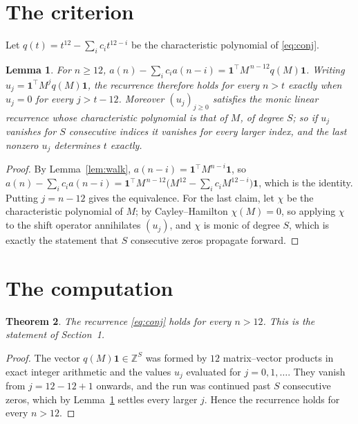 \documentclass[11pt,a4paper]{article}
\theoremstyle{plain}
\newtheorem{theorem}{Theorem}
\newtheorem{lemma}[theorem]{Lemma}
\theoremstyle{definition}
\begin{document}
\section{The criterion}

Let $q(t)=t^{12}-\sum_i c_i t^{12-i}$ be the characteristic polynomial of
\eqref{eq:conj}.

\begin{lemma}\label{lem:crit}
For $n\ge12$,
$a(n)-\sum_i c_i a(n-i)=\mathbf{1}^{\!\top}M^{\,n-12}q(M)\mathbf{1}$. Writing
$u_j=\mathbf{1}^{\!\top}M^{j}q(M)\mathbf{1}$, the recurrence therefore holds for every
$n>t$ exactly when $u_j=0$ for every $j>t-12$. Moreover $(u_j)_{j\ge0}$ satisfies the
monic linear recurrence whose characteristic polynomial is that of $M$, of degree $S$; so
if $u_j$ vanishes for $S$ consecutive indices it vanishes for every larger index, and the
last nonzero $u_j$ determines $t$ exactly.
\end{lemma}

\begin{proof}
By Lemma~\ref{lem:walk}, $a(n-i)=\mathbf{1}^{\!\top}M^{n-i}\mathbf{1}$, so
$a(n)-\sum_i c_i a(n-i)
=\mathbf{1}^{\!\top}M^{\,n-12}\bigl(M^{12}-\sum_i c_i M^{12-i}\bigr)
\mathbf{1}$, which is the identity. Putting $j=n-12$ gives the equivalence. For the
last claim, let $\chi$ be the characteristic polynomial of $M$; by Cayley--Hamilton
$\chi(M)=0$, so applying $\chi$ to the shift operator annihilates $(u_j)$, and $\chi$ is
monic of degree $S$, which is exactly the statement that $S$ consecutive zeros propagate
forward.
\end{proof}

\section{The computation}

\begin{theorem}
The recurrence \eqref{eq:conj} holds for every $n>12$. This is the statement of
Section~1.
\end{theorem}

\begin{proof}
The vector $q(M)\mathbf{1}\in\mathbb{Z}^{S}$ was formed by $12$ matrix--vector
products in exact integer arithmetic and the values $u_j$ evaluated for
$j=0,1,\dots$. They vanish from $j=12-12+1$ onwards, and the run was continued past
$S$ consecutive zeros, which by Lemma~\ref{lem:crit} settles every larger $j$. Hence the
recurrence holds for every $n>12$.
\end{proof}
\end{document}
